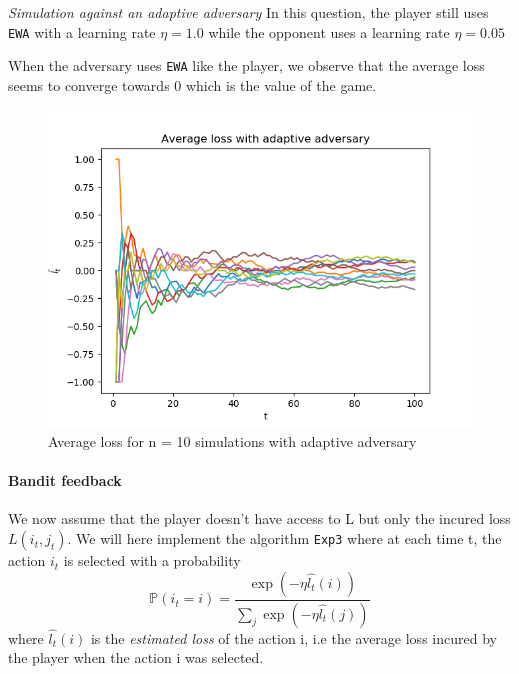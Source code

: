  \textit{Simulation against an adaptive adversary}
In this question, the player still uses \texttt{EWA} with a learning rate $\eta = 1.0$ while the opponent uses a learning rate $\eta = 0.05$

When the adversary uses \texttt{EWA} like the player, we observe that the average loss seems to converge towards 0 which is the value of the game.

\begin{figure}
	\includegraphics[width=\textwidth]{images/question4a}
	\caption{Average loss for n = 10 simulations with adaptive adversary}
	\label{fig:question4a}
\end{figure}

\begin{figure}[h!]
	\qquad
	\label{fig:question4b}
\end{figure}

\paragraph*{Bandit feedback} We now assume that the player doesn't have access to L but only the incured loss $L(i_t, j_t)$. We will here implement the algorithm \texttt{Exp3} where at each time t, the action $i_t$ is selected with a probability
\begin{equation}
\mathbb{P}(i_t = i) = \frac{\exp{(- \eta \hat{l_t}(i))}}{\sum_j \exp{(- \eta \hat{l_t}(j))}}
\label{exp3equation}
\end{equation}
where $\hat{l_t}(i)$ is the \textit{estimated loss} of the action i, i.e the average loss incured by the player when the action i was selected.

